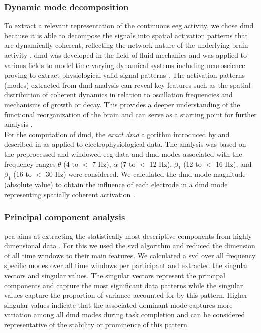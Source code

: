 \subsubsection{Dynamic mode decomposition}
To extract a relevant representation of the continuous \gls{eeg} activity, we chose \gls{dmd} because it is able to decompose the signals into spatial activation patterns that are dynamically coherent, reflecting the network nature of the underlying brain activity \cite{Brunton2016}. \Gls{dmd} was developed in the field of fluid mechanics and was applied to various fields to model time-varying dynamical systems including neuroscience proving to extract physiological valid signal patterns \cite{Brunton2016, Kunert-Graf2019, Schmid2010, Schmid2008}. The activation patterns (modes) extracted from \gls{dmd} analysis can reveal key features such as the spatial distribution of coherent dynamics in relation to oscillation frequencies and mechanisms of growth or decay. This provides a deeper understanding of the functional reorganization of the brain and can serve as a starting point for further analysis \cite{Brunton2016}.\\
For the computation of \gls{dmd}, the \textit{exact \gls{dmd}} algorithm introduced by \citeauthor{Tu2014} \cite{Tu2014} and described in \cite{Brunton2016} as applied to electrophysiological data. The analysis was based on the preprocessed and windowed \gls{eeg} data and \gls{dmd} modes associated with the frequency ranges $\theta$ (4 to $<$ 7 Hz), $\alpha$ (7 to $<$ 12 Hz), $\beta_1$ (12 to $<$ 16 Hz), and $\beta_1$ (16 to $<$ 30 Hz) were considered. We calculated the \gls{dmd} mode magnitude (absolute value) to obtain the influence of each electrode in a \gls{dmd} mode representing spatially coherent activation \cite{Brunton2016}.

\subsubsection{Principal component analysis}
\Gls{pca} aims at extracting the statistically most descriptive components from highly dimensional data \cite{Brunton_kutz_2019}. For this we used the \gls{svd} algorithm and reduced the dimension of all time windows to their main features. We calculated a \gls{svd} over all frequency specific modes over all time windows per participant and extracted the singular vectors and singular values. The singular vectors represent the principal components and capture the most significant data patterns while the singular values capture the proportion of variance accounted for by this pattern. Higher singular values indicate that the associated dominant mode captures more variation among all \gls{dmd} modes during task completion and can be considered representative of the stability or prominence of this pattern.

